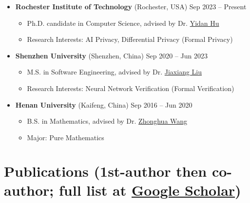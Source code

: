 \documentclass[a4paper,11pt]{article}
\begin{document}
\begin{itemize}[leftmargin=0pt,label={}]
    \item \textbf{Rochester Institute of Technology}{ \scriptsize (Rochester, USA)} \hfill Sep 2023 -- Present\vspace{-0.5em}    
    \begin{itemize}
      \item Ph.D. candidate in Computer Science, advised by Dr. \href{https://yidanhu.csec.rit.edu/}{Yidan Hu}
      \item Research Interests: AI Privacy, Differential Privacy (Formal Privacy)
    \end{itemize}
    \item \textbf{Shenzhen University}{ \scriptsize (Shenzhen, China)} \hfill Sep 2020 -- Jun 2023\vspace{-0.5em}
    \begin{itemize}
      \item M.S. in Software Engineering, advised by Dr. \href{https://csse.szu.edu.cn/pages/user/index?id=1031}{Jiaxiang Liu}
      \item Research Interests: Neural Network Verification (Formal Verification)
    \end{itemize}
    \item \textbf{Henan University}{ \scriptsize (Kaifeng, China)} \hfill Sep 2016 -- Jun 2020\vspace{-0.5em}
    \begin{itemize}
      \item B.S. in Mathematics, advised by Dr. \href{https://maths.henu.edu.cn/info/1204/3593.htm}{Zhonghua Wang}
      \item Major: Pure Mathematics
    \end{itemize}
\end{itemize}


\section[\textbf{Publications}]{\textbf{Publications} \textnormal{\scriptsize (1st-author then co-author; full list at \href{https://scholar.google.com/citations?hl=en&user=fIwzSr4AAAAJ&view_op=list_works&sortby=pubdate}{Google Scholar})}}


\end{document}
